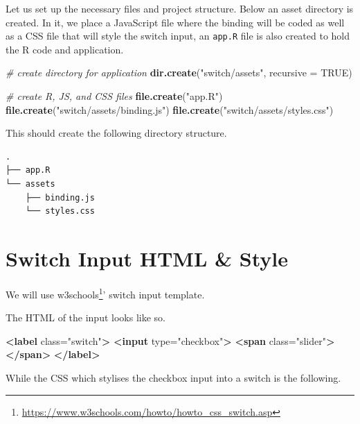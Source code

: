 \documentclass[
  10pt,
]{krantz}
\makeatletter
\newenvironment{Shaded}{\begin{snugshade}}{\end{snugshade}}
\newcommand{\CommentTok}[1]{\textcolor[rgb]{0.37,0.37,0.37}{\textit{#1}}}
\newcommand{\DataTypeTok}[1]{\textcolor[rgb]{0.27,0.27,0.27}{#1}}
\newcommand{\KeywordTok}[1]{\textcolor[rgb]{0.27,0.27,0.27}{\textbf{#1}}}
\newcommand{\NormalTok}[1]{#1}
\newcommand{\OtherTok}[1]{\textcolor[rgb]{0.37,0.37,0.37}{#1}}
\newcommand{\StringTok}[1]{\textcolor[rgb]{0.5,0.5,0.5}{#1}}
\renewcommand{\href}[2]{#2\footnote{\url{#1}}}
\newenvironment{kframe}{%
\medskip{}
\setlength{\fboxsep}{.8em}
 \def\at@end@of@kframe{}%
 \ifinner\ifhmode%
  \def\at@end@of@kframe{\end{minipage}}%
  \begin{minipage}{\columnwidth}%
 \fi\fi%
 \def\FrameCommand##1{\hskip\@totalleftmargin \hskip-\fboxsep
 \colorbox{shadecolor}{##1}\hskip-\fboxsep
     \hskip-\linewidth \hskip-\@totalleftmargin \hskip\columnwidth}%
 \MakeFramed {\advance\hsize-\width
   \@totalleftmargin\z@ \linewidth\hsize
   \@setminipage}}%
 {\par\unskip\endMakeFramed%
 \at@end@of@kframe}
\renewenvironment{Shaded}{\begin{kframe}}{\end{kframe}}
\makeatother
\begin{document}
Let us set up the necessary files and project structure. Below an asset directory is created. In it, we place a JavaScript file where the binding will be coded as well as a CSS file that will style the switch input, an \texttt{app.R} file is also created to hold the R code and application.

\begin{Shaded}
\begin{Highlighting}[]
\CommentTok{\# create directory for application}
\KeywordTok{dir.create}\NormalTok{(}\StringTok{"switch/assets"}\NormalTok{, }\DataTypeTok{recursive =} \OtherTok{TRUE}\NormalTok{)}

\CommentTok{\# create R, JS, and CSS files}
\KeywordTok{file.create}\NormalTok{(}\StringTok{"app.R"}\NormalTok{)}
\KeywordTok{file.create}\NormalTok{(}\StringTok{"switch/assets/binding.js"}\NormalTok{)}
\KeywordTok{file.create}\NormalTok{(}\StringTok{"switch/assets/styles.css"}\NormalTok{)}
\end{Highlighting}
\end{Shaded}

This should create the following directory structure.

\begin{verbatim}
.
├── app.R
└── assets
    ├── binding.js
    └── styles.css
\end{verbatim}

\hypertarget{shiny-input-intro}{%
\section{Switch Input HTML \& Style}\label{shiny-input-intro}}

We will use \href{https://www.w3schools.com/howto/howto_css_switch.asp}{w3schools}' switch input template.

The HTML of the input looks like so.

\begin{Shaded}
\begin{Highlighting}[]
\KeywordTok{<label}\OtherTok{ class=}\StringTok{"switch"}\KeywordTok{>}
  \KeywordTok{<input}\OtherTok{ type=}\StringTok{"checkbox"}\KeywordTok{>}
  \KeywordTok{<span}\OtherTok{ class=}\StringTok{"slider"}\KeywordTok{></span>}
\KeywordTok{</label>}
\end{Highlighting}
\end{Shaded}

While the CSS which stylises the checkbox input into a switch is the following.
\end{document}
